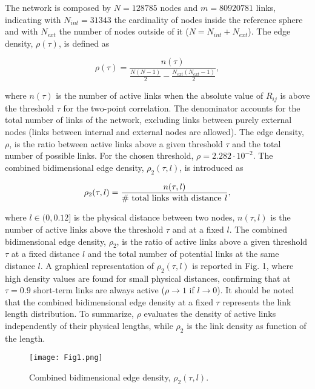 \documentclass{ws-ijbc}
\begin{document}
The network is composed by $N=128785$ nodes and $m=80920781$ links, indicating with $N_{int}=31343$ the cardinality of nodes inside the reference sphere and with $N_{ext}$ the number of nodes outside of it ($N=N_{int} + N_{ext}$). The edge density, $\rho(\tau)$, is defined as

\begin{equation}
\rho(\tau) = \frac{n(\tau)}{\frac{N(N-1)}{2} - \frac{N_{ext}(N_{ext}-1)}{2}},
\end{equation}

\noindent where $n(\tau)$ is the number of active links when the absolute value of $R_{ij}$ is above the threshold $\tau$ for the two-point correlation. The denominator accounts for the total number of links of the network, excluding links between purely external nodes (links between internal and external nodes are allowed). The edge density, $\rho$, is the ratio between active links above a given threshold $\tau$ and the total number of possible links. For the chosen threshold, $\rho=2.282 \cdot 10^{-2}$. The combined bidimensional edge density, $\rho_{2}(\tau,l)$, is introduced as

\begin{equation}
\rho_{2}(\tau,l) = \frac{n(\tau,l)}{\textmd{\# total links with distance \emph{l}}},
\end{equation}

\noindent where $l \in (0, 0.12]$ is the physical distance between two nodes, $n(\tau,l)$ is the number of active links above the threshold $\tau$ and at a fixed $l$. The combined bidimensional edge density, $\rho_2$, is the ratio of active links above a given threshold $\tau$ at a fixed distance $l$ and the total number of potential links at the same distance $l$. A graphical representation of $\rho_{2}(\tau,l)$ is reported in Fig. 1, where high density values are found for small physical distances, confirming that at $\tau=0.9$ short-term links are always active ($\rho \rightarrow 1$ if $l \rightarrow 0$). It should be noted that the combined bidimensional edge density at a fixed $\tau$ represents the link length distribution. To summarize, $\rho$ evaluates the density of active links independently of their physical lengths, while $\rho_2$ is the link density as function of the length.

\begin{figure}[h]
\centering
\texttt{[image: Fig1.png]}
\caption{Combined bidimensional edge density, $\rho_{2}(\tau,l)$.}
\label{edge}
\end{figure}
\end{document}
